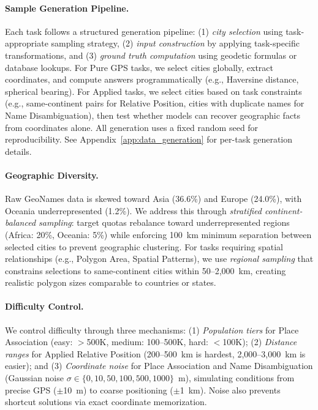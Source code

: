 \paragraph{Sample Generation Pipeline.}
Each task follows a structured generation pipeline: (1) \textit{city selection} using task-appropriate sampling strategy, (2) \textit{input construction} by applying task-specific transformations, and (3) \textit{ground truth computation} using geodetic formulas or database lookups. For Pure GPS tasks, we select cities globally, extract coordinates, and compute answers programmatically (e.g., Haversine distance, spherical bearing). For Applied tasks, we select cities based on task constraints (e.g., same-continent pairs for Relative Position, cities with duplicate names for Name Disambiguation), then test whether models can recover geographic facts from coordinates alone. All generation uses a fixed random seed for reproducibility. See Appendix~\ref{app:data_generation} for per-task generation details.

\paragraph{Geographic Diversity.}
Raw GeoNames data is skewed toward Asia (36.6\%) and Europe (24.0\%), with Oceania underrepresented (1.2\%). We address this through \textit{stratified continent-balanced sampling}: target quotas rebalance toward underrepresented regions (Africa: 20\%, Oceania: 5\%) while enforcing 100~km minimum separation between selected cities to prevent geographic clustering. For tasks requiring spatial relationships (e.g., Polygon Area, Spatial Patterns), we use \textit{regional sampling} that constrains selections to same-continent cities within 50--2,000~km, creating realistic polygon sizes comparable to countries or states.

\paragraph{Difficulty Control.}
We control difficulty through three mechanisms: (1) \textit{Population tiers} for Place Association (easy: $>$500K, medium: 100--500K, hard: $<$100K); (2) \textit{Distance ranges} for Applied Relative Position (200--500~km is hardest, 2,000--3,000~km is easier); and (3) \textit{Coordinate noise} for Place Association and Name Disambiguation (Gaussian noise $\sigma \in \{0, 10, 50, 100, 500, 1000\}$~m), simulating conditions from precise GPS ($\pm$10~m) to coarse positioning ($\pm$1~km). Noise also prevents shortcut solutions via exact coordinate memorization.

